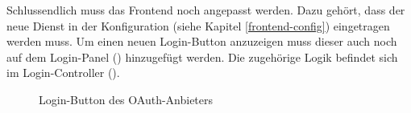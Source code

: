 Schlussendlich muss das Frontend noch angepasst werden.
Dazu gehört, dass der neue Dienst in der Konfiguration (siehe Kapitel \ref{frontend-config}) eingetragen werden muss.
Um einen neuen Login-Button anzuzeigen muss dieser auch noch auf dem Login-Panel () hinzugefügt werden.
Die zugehörige Logik befindet sich im Login-Controller ().
\begin{figure}[H]
\caption{Login-Button des OAuth-Anbieters}
\end{figure}


